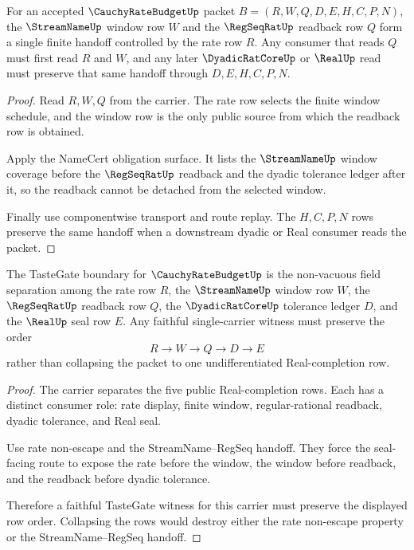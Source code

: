 \begin{theorem}
\label{thm:cauchy-rate-budget-streamname-regseq-handoff}
For an accepted $\CauchyRateBudgetUp$ packet $B=(R,W,Q,D,E,H,C,P,N)$, the $\StreamNameUp$ window row $W$ and the $\RegSeqRatUp$ readback row $Q$ form a single finite handoff controlled by the rate row $R$. Any consumer that reads $Q$ must first read $R$ and $W$, and any later $\DyadicRatCoreUp$ or $\RealUp$ read must preserve that same handoff through $D,E,H,C,P,N$.
\end{theorem}
\begin{proof}
Read $R,W,Q$ from the carrier. The rate row selects the finite window schedule, and the window row is the only public source from which the readback row is obtained.

Apply the NameCert obligation surface. It lists the $\StreamNameUp$ window coverage before the $\RegSeqRatUp$ readback and the dyadic tolerance ledger after it, so the readback cannot be detached from the selected window.

Finally use componentwise transport and route replay. The $H,C,P,N$ rows preserve the same handoff when a downstream dyadic or Real consumer reads the packet.
\end{proof}

\begin{theorem}
\label{thm:cauchy-rate-budget-tastegate-boundary}
The TasteGate boundary for $\CauchyRateBudgetUp$ is the non-vacuous field separation among the rate row $R$, the $\StreamNameUp$ window row $W$, the $\RegSeqRatUp$ readback row $Q$, the $\DyadicRatCoreUp$ tolerance ledger $D$, and the $\RealUp$ seal row $E$. Any faithful single-carrier witness must preserve the order
$$
R \to W \to Q \to D \to E
$$
rather than collapsing the packet to one undifferentiated Real-completion row.
\end{theorem}
\begin{proof}
The carrier separates the five public Real-completion rows. Each has a distinct consumer role: rate display, finite window, regular-rational readback, dyadic tolerance, and Real seal.

Use rate non-escape and the StreamName--RegSeq handoff. They force the seal-facing route to expose the rate before the window, the window before readback, and the readback before dyadic tolerance.

Therefore a faithful TasteGate witness for this carrier must preserve the displayed row order. Collapsing the rows would destroy either the rate non-escape property or the StreamName--RegSeq handoff.
\end{proof}

